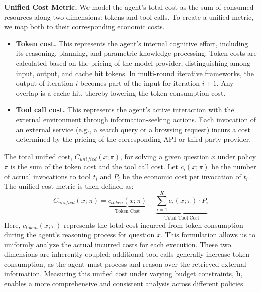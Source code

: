 \textbf{Unified Cost Metric.} We model the agent's total cost as the sum of consumed resources along two dimensions: tokens and tool calls. To create a unified metric, we map both to their corresponding economic costs.
\begin{itemize}
    \item \textbf{Token cost.} This represents the agent's internal cognitive effort, including its reasoning, planning, and parametric knowledge processing. Token costs are calculated based on the pricing of the model provider, distinguishing among input, output, and cache hit tokens. In multi-round iterative frameworks, the output of iteration $i$ becomes part of the input for iteration $i+1$. Any overlap is a cache hit, thereby lowering the token consumption cost. 
    \item \textbf{Tool call cost.} This represents the agent's active interaction with the external environment through information-seeking actions. Each invocation of an external service (e.g., a search query or a browsing request) incurs a cost determined by the pricing of the corresponding API or third-party provider. 
\end{itemize}
The total unified cost, $C_{\textit{unified}}(x;\pi)$, for solving a given question $x$ under policy $\pi$ is the sum of the token cost and the tool call cost. Let $c_i(x;\pi)$ be the number of actual invocations to tool $t_i$ and $P_i$ be the economic cost per invocation of $t_i$. The unified cost metric is then defined as:
\begin{equation}
\label{eq:unified-cost-definition}
C_{\textit{unified}}(x;\pi) = \underbrace{c_{\textit{token}}(x;\pi)}_{\text{Token Cost}} + \underbrace{\sum_{i=1}^{K} c_i(x;\pi) \cdot P_i}_{\text{Total Tool Cost}}
\end{equation}
Here, $c_{\textit{token}}(x;\pi)$ represents the total cost incurred from token consumption during the agent's reasoning process for question $x$. This formulation allows us to uniformly analyze the actual incurred costs for each execution. These two dimensions are inherently coupled: additional tool calls generally increase token consumption, as the agent must process and reason over the retrieved external information. Measuring this unified cost under varying budget constraints, $\mathbf{b}$, enables a more comprehensive and consistent analysis across different policies.


